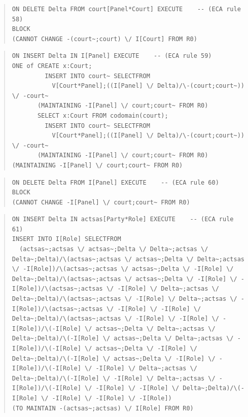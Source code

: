 \documentclass[10pt,a4paper]{report}              %
\theoremstyle{plain}\theorembodyfont{\rmfamily}\newtheorem{definition}{Definition}[section]
\theoremstyle{plain}\theorembodyfont{\rmfamily}\newtheorem{designrule}[definition]{Requirement}
\begin{document}
\begin{quote}
\begin{verbatim}
ON DELETE Delta FROM court[Panel*Court] EXECUTE    -- (ECA rule 58)
BLOCK
(CANNOT CHANGE -(court~;court) \/ I[Court] FROM R0)
\end{verbatim}
\end{quote}
\begin{quote}
\begin{verbatim}
ON INSERT Delta IN I[Panel] EXECUTE    -- (ECA rule 59)
ONE of CREATE x:Court;
         INSERT INTO court~ SELECTFROM
           V[Court*Panel];((I[Panel] \/ Delta)/\-(court;court~)) \/ -court~
       (MAINTAINING -I[Panel] \/ court;court~ FROM R0)
       SELECT x:Court FROM codomain(court);
         INSERT INTO court~ SELECTFROM
           V[Court*Panel];((I[Panel] \/ Delta)/\-(court;court~)) \/ -court~
       (MAINTAINING -I[Panel] \/ court;court~ FROM R0)
(MAINTAINING -I[Panel] \/ court;court~ FROM R0)
\end{verbatim}
\end{quote}
\begin{quote}
\begin{verbatim}
ON DELETE Delta FROM I[Panel] EXECUTE    -- (ECA rule 60)
BLOCK
(CANNOT CHANGE -I[Panel] \/ court;court~ FROM R0)
\end{verbatim}
\end{quote}
\begin{quote}
\begin{verbatim}
ON INSERT Delta IN actsas[Party*Role] EXECUTE    -- (ECA rule 61)
INSERT INTO I[Role] SELECTFROM
  (actsas~;actsas \/ actsas~;Delta \/ Delta~;actsas \/ Delta~;Delta)/\(actsas~;actsas \/ actsas~;Delta \/ Delta~;actsas \/ -I[Role])/\(actsas~;actsas \/ actsas~;Delta \/ -I[Role] \/ Delta~;Delta)/\(actsas~;actsas \/ actsas~;Delta \/ -I[Role] \/ -I[Role])/\(actsas~;actsas \/ -I[Role] \/ Delta~;actsas \/ Delta~;Delta)/\(actsas~;actsas \/ -I[Role] \/ Delta~;actsas \/ -I[Role])/\(actsas~;actsas \/ -I[Role] \/ -I[Role] \/ Delta~;Delta)/\(actsas~;actsas \/ -I[Role] \/ -I[Role] \/ -I[Role])/\(-I[Role] \/ actsas~;Delta \/ Delta~;actsas \/ Delta~;Delta)/\(-I[Role] \/ actsas~;Delta \/ Delta~;actsas \/ -I[Role])/\(-I[Role] \/ actsas~;Delta \/ -I[Role] \/ Delta~;Delta)/\(-I[Role] \/ actsas~;Delta \/ -I[Role] \/ -I[Role])/\(-I[Role] \/ -I[Role] \/ Delta~;actsas \/ Delta~;Delta)/\(-I[Role] \/ -I[Role] \/ Delta~;actsas \/ -I[Role])/\(-I[Role] \/ -I[Role] \/ -I[Role] \/ Delta~;Delta)/\(-I[Role] \/ -I[Role] \/ -I[Role] \/ -I[Role])
(TO MAINTAIN -(actsas~;actsas) \/ I[Role] FROM R0)
\end{verbatim}
\end{quote}
\end{document}
